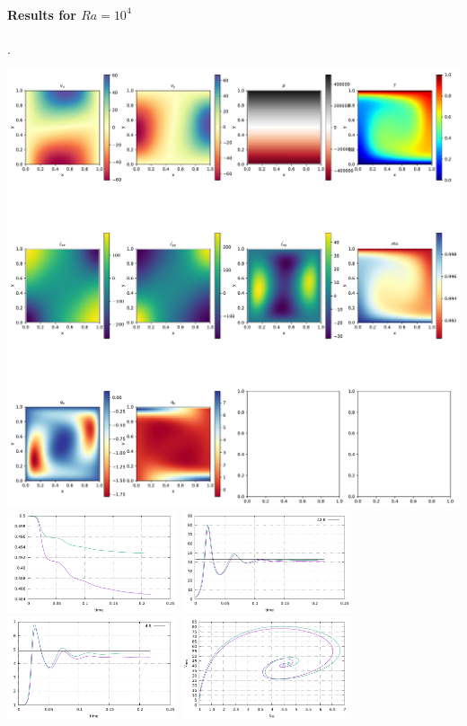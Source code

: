 \paragraph{Results for $Ra=10^4$}.
\begin{center}
\includegraphics[width=16cm]{python_codes/fieldstone_03/results_1e4/48x48/solution.pdf}\\
\includegraphics[width=5cm]{python_codes/fieldstone_03/results_1e4/Tavrg.pdf}
\includegraphics[width=5cm]{python_codes/fieldstone_03/results_1e4/vrms.pdf}\\
\includegraphics[width=5cm]{python_codes/fieldstone_03/results_1e4/Nu.pdf}
\includegraphics[width=5cm]{python_codes/fieldstone_03/results_1e4/Nu_vrms.pdf}
\end{center}

